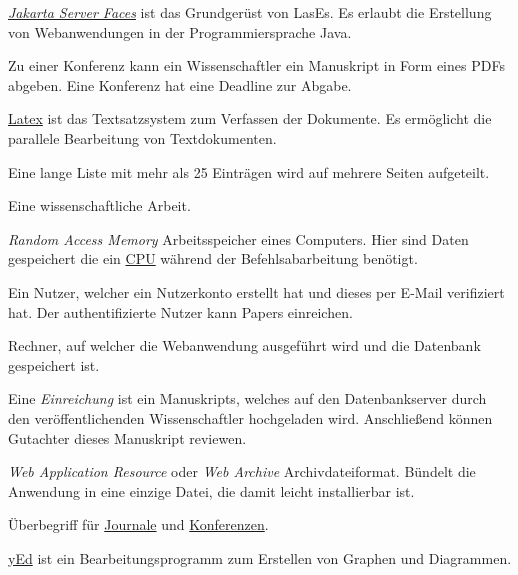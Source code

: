 \begin{description}
	 \href{https://jakarta.ee/specifications/faces/}{\emph{Jakarta Server Faces}} ist das Grundgerüst von LasEs. Es erlaubt die Erstellung von Webanwendungen in der Programmiersprache Java.

	 Zu einer Konferenz kann ein Wissenschaftler ein Manuskript in Form eines PDFs abgeben. Eine Konferenz hat eine Deadline zur Abgabe.

	 \href{https://www.latex-project.org/}{Latex} ist das Textsatzsystem zum Verfassen der Dokumente. Es ermöglicht die parallele Bearbeitung von Textdokumenten.

	 Eine lange Liste mit mehr als 25 Einträgen wird auf mehrere Seiten aufgeteilt.

	 Eine wissenschaftliche Arbeit.

	 \emph{Random Access Memory} Arbeitsspeicher eines Computers. Hier sind Daten gespeichert die ein \hyperref[glo:cpu]{CPU} während der Befehlsabarbeitung benötigt.

	 Ein Nutzer, welcher ein Nutzerkonto erstellt hat und dieses per E-Mail verifiziert hat. Der authentifizierte Nutzer kann Papers einreichen.

	 Rechner, auf welcher die Webanwendung ausgeführt wird und die Datenbank gespeichert ist.

	 Eine \emph{Einreichung} ist ein Manuskripts, welches auf den Datenbankserver durch den veröffentlichenden Wissenschaftler hochgeladen wird. Anschließend können Gutachter dieses Manuskript reviewen.

	 \emph{Web Application Resource} oder \emph{Web Archive} Archivdateiformat. Bündelt die Anwendung in eine einzige Datei, die damit leicht installierbar ist.

	 Überbegriff für \hyperref[glo:journal]{Journale} und \hyperref[glo:konf]{Konferenzen}.

	 \href{https://www.yworks.com/products/yed}{yEd} ist ein Bearbeitungsprogramm zum Erstellen von Graphen und Diagrammen.
\end{description}